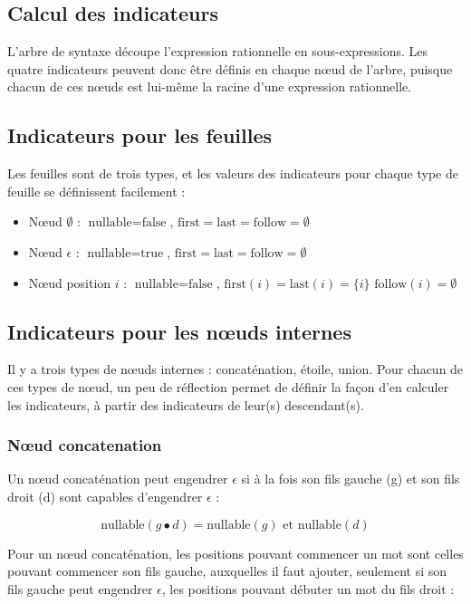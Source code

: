 \documentclass{article}
\begin{document}
\subsection{Calcul des indicateurs}
L'arbre de syntaxe découpe l'expression rationnelle en sous-expressions. Les quatre indicateurs peuvent donc  être définis en chaque n\oe ud de l'arbre, puisque chacun de ces n\oe uds est lui-même la racine d'une expression rationnelle. 

\subsection{Indicateurs pour les feuilles}
Les feuilles sont de trois types, et les valeurs des indicateurs pour chaque type de feuille se définissent facilement : 
\begin{itemize}
\item N\oe ud $\emptyset$ : $\mbox{nullable}=\mbox{false}$, $\mbox{first}=\mbox{last}=\mbox{follow}=\emptyset$
\item N\oe ud $\epsilon$ : $\mbox{nullable}=\mbox{true}$, $\mbox{first}=\mbox{last}=\mbox{follow}=\emptyset$
\item N\oe ud position $i$ : $\mbox{nullable}=\mbox{false}$, $\mbox{first}(i)=\mbox{last}(i)=\{i\}$ $\mbox{follow}(i)=\emptyset$
\end{itemize}


\subsection{Indicateurs pour les n\oe uds internes}
Il y a trois types de n\oe uds internes : concaténation, étoile, union. Pour chacun de ces types de n\oe ud, un peu de réflection permet de définir la façon d'en calculer les indicateurs, à partir des indicateurs de leur(s) descendant(s). 

\subsubsection{N\oe ud concatenation}
Un n\oe ud concaténation peut engendrer $\epsilon$ si à la fois son fils gauche (g)  et son fils droit (d) sont capables d'engendrer $\epsilon$ : 

$$\mbox{nullable}(g \bullet d)=\mbox{nullable}(g) \mbox{ et } \mbox{nullable}(d)$$



Pour un n\oe ud concaténation, les positions pouvant commencer un mot sont celles pouvant commencer son fils gauche, auxquelles il faut ajouter, seulement si son fils gauche peut engendrer $\epsilon$, les positions pouvant débuter un mot du fils droit : 
\end{document}
